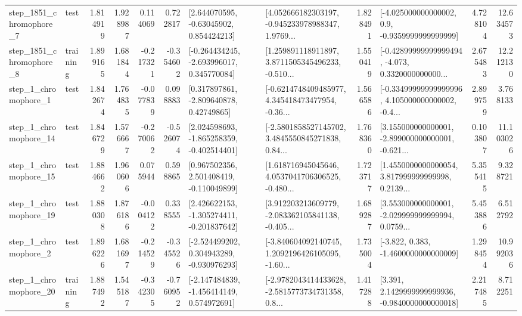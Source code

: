\begin{tabular}{llrrrrllrlrr}
  step\_1851\_chromophore\_7 &      test &      1.814919 &    1.928987 &      0.114069 &  0.722817 &     [2.644070595, -0.63045902, 0.854424213] &  [4.052666182303197, -0.945233978988347, 1.9769... &       1.828491 &     [-4.025000000000002, 0.9, -0.9359999999999999] &            4.728104 &         12.634573 \\
  step\_1851\_chromophore\_8 &  training &      1.899165 &    1.681844 &     -0.217321 & -0.354602 &   [-0.264434245, -2.693996017, 0.345770084] &  [1.259891118911897, 3.8711505345496233, -0.510... &       1.550419 &  [-0.42899999999999494, -4.073, 0.3320000000000... &            2.675483 &         12.212130 \\
     step\_1\_chromophore\_1 &      test &      1.842674 &    1.764835 &     -0.077839 &  0.098883 &     [0.317897861, -2.809640878, 0.42749865] &  [-0.6214748409485977, 4.345418473477954, -0.36... &       1.566586 &  [-0.33499999999999996, 4.105000000000002, -0.4... &            2.899759 &          3.768133 \\
    step\_1\_chromophore\_14 &      test &      1.846729 &    1.576667 &     -0.270062 & -0.526074 &   [2.024598693, -1.865258359, -0.402514401] &  [-2.5801858527145702, 3.4845550845271838, 0.84... &       1.768360 &  [3.155000000000001, -2.899000000000001, -0.621... &            0.103807 &         11.103026 \\
    step\_1\_chromophore\_15 &      test &      1.884662 &    1.960606 &      0.075944 &  0.598865 &    [0.967502356, 2.501408419, -0.110049899] &  [1.618716945045646, 4.0537041706306525, -0.480... &       1.723717 &  [1.4550000000000054, 3.817999999999998, 0.2139... &            5.355415 &          9.328721 \\
    step\_1\_chromophore\_19 &      test &      1.880308 &    1.876186 &     -0.004122 &  0.338555 &   [2.426622153, -1.305274411, -0.201837642] &  [3.912203213609779, -2.083362105841138, -0.405... &       1.689287 &  [3.553000000000001, -2.029999999999994, 0.0759... &            5.453886 &          6.512792 \\
     step\_1\_chromophore\_2 &      test &      1.896226 &    1.681697 &     -0.214529 & -0.345526 &   [-2.524499202, 0.304943289, -0.930976293] &  [-3.840604092140745, 1.2092196426105095, -1.60... &       1.735004 &               [-3.822, 0.383, -1.4600000000000009] &            1.298454 &         10.992036 \\
    step\_1\_chromophore\_20 &  training &      1.887492 &    1.545187 &     -0.342305 & -0.760952 &   [-2.147484839, -1.456414149, 0.574972691] &  [-2.9782043414433628, -2.5815773734731358, 0.8... &       1.417288 &   [3.391, 2.1429999999999936, -0.9840000000000018] &            2.217485 &          8.712251 \\

\end{tabular}
